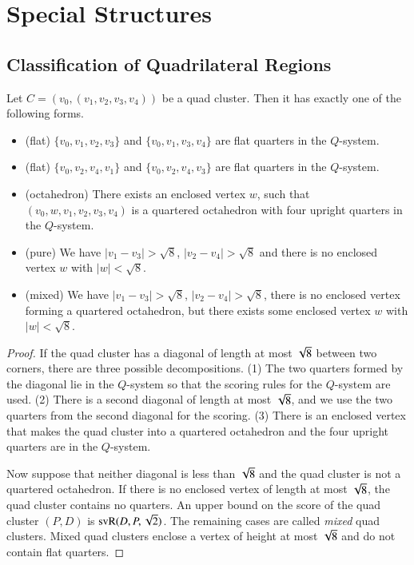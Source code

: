 




\section{Special Structures}

\subsection{Classification of Quadrilateral Regions}
\label{sec:quad-class}


\begin{lemma}\label{quad:classify}
Let $C=(v_0,(v_1,v_2,v_3,v_4))$ be a quad cluster.  Then it has
exactly one of the following forms.
\begin{itemize}
  \item (flat) $\{v_0,v_1,v_2,v_3\}$ and $\{v_0,v_1,v_3,v_4\}$ are flat
    quarters in the $Q$-system.
   \item (flat) $\{v_0,v_2,v_4,v_1\}$ and $\{v_0,v_2,v_4,v_3\}$ are flat
     quarters in the $Q$-system.
     \item (octahedron) There exists an enclosed vertex $w$, such that
       $(v_0,w,v_1,v_2,v_3,v_4)$ is a quartered octahedron with
       four upright quarters in the $Q$-system.
   \item (pure) We have $|v_1-v_3|>\sqrt8$, $|v_2-v_4|>\sqrt8$ and
     there is no enclosed vertex $w$ with $|w|<\sqrt8$.
    \item (mixed) We have $|v_1-v_3|>\sqrt8$, $|v_2-v_4|>\sqrt8$, there
      is no enclosed vertex forming a quartered octahedron, but
      there exists some enclosed vertex $w$ with $|w|<\sqrt8$.
\end{itemize}
\end{lemma}

\begin{proof}
If the quad cluster has a diagonal of length at most $\sqrt8$
between two corners, there are three possible decompositions. (1)
The two quarters formed by the diagonal lie in the $Q$-system so
that the scoring rules for the $Q$-system are used.  (2) There is
a second diagonal of length at most $\sqrt8$, and we use the two
quarters from the second diagonal for the scoring. (3) There is an
enclosed vertex that makes the quad cluster into a quartered
octahedron and the four upright quarters are in the $Q$-system.

Now suppose that neither diagonal is less than $\sqrt8$ and the
quad cluster is not a quartered octahedron. If there is no
enclosed vertex of length at most $\sqrt8$, the quad cluster
contains no quarters. An upper bound on the score of the quad
cluster $(P,D)$ is ${\operatorname{svR}}(D,P,\sqrt2)$. The remaining cases are
called {\it mixed\/} quad clusters. Mixed quad clusters enclose a
vertex of height at most $\sqrt8$ and do not contain flat quarters.
\end{proof}




